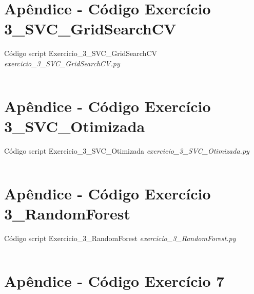 \inputminted[linenos,framesep=1mm, baselinestretch=0.8,]{python}{Apendices/exercicio_3_SVC.py}



\renewcommand{\leftmark}{Apêndice - Código Exercício 3\_SVC\_GridSearchCV}
\section*{Apêndice - Código Exercício 3\_SVC\_GridSearchCV} \label{Apêndice - Código Exercício 3 SVC GridSearchCV}

Código script Exercicio\_3\_SVC\_GridSearchCV \textit{exercicio\_3\_SVC\_GridSearchCV.py}

\inputminted[linenos,framesep=1mm, baselinestretch=0.8,]{python}{Apendices/exercicio_3_SVC_GridSearchCV.py}



\renewcommand{\leftmark}{Apêndice - Código Exercício 3\_SVC\_Otimizada}
\section*{Apêndice - Código Exercício 3\_SVC\_Otimizada} \label{Apêndice - Código Exercício 3 SVC Otimizada}

Código script Exercicio\_3\_SVC\_Otimizada \textit{exercicio\_3\_SVC\_Otimizada.py}

\inputminted[linenos,framesep=1mm, baselinestretch=0.8,]{python}{Apendices/exercicio_3_SVC_Otimizada.py}



\renewcommand{\leftmark}{Apêndice - Código Exercício 3\_RandomForest}
\section*{Apêndice - Código Exercício 3\_RandomForest} \label{Apêndice - Código Exercício 3 RandomForest}

Código script Exercicio\_3\_RandomForest \textit{exercicio\_3\_RandomForest.py}

\inputminted[linenos,framesep=1mm, baselinestretch=0.8,]{python}{Apendices/exercicio_3_RandomForest.py}


\renewcommand{\leftmark}{Apêndice - Código Exercício 7}
\section*{Apêndice - Código Exercício 7} \label{Apêndice - Código Exercício 7}

